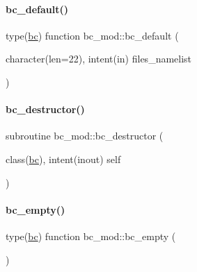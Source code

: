 \paragraph{\texorpdfstring{bc\+\_\+default()}{bc\_default()}}
{\footnotesize\ttfamily type(\mbox{\hyperlink{structbc__mod_1_1bc}{bc}}) function bc\+\_\+mod\+::bc\+\_\+default (\begin{DoxyParamCaption}\item[{character(len=22), intent(in)}]{files\+\_\+namelist }\end{DoxyParamCaption})\hspace{0.3cm}{\ttfamily [private]}}

\mbox{\label{namespacebc__mod_a27478494ca4ab470a05ec781192c89e4}} 
\paragraph{\texorpdfstring{bc\+\_\+destructor()}{bc\_destructor()}}
{\footnotesize\ttfamily subroutine bc\+\_\+mod\+::bc\+\_\+destructor (\begin{DoxyParamCaption}\item[{class(\mbox{\hyperlink{structbc__mod_1_1bc}{bc}}), intent(inout)}]{self }\end{DoxyParamCaption})}

\mbox{\label{namespacebc__mod_ae334c602c9a98a75ca25a7af333bb845}} 
\paragraph{\texorpdfstring{bc\+\_\+empty()}{bc\_empty()}}
{\footnotesize\ttfamily type(\mbox{\hyperlink{structbc__mod_1_1bc}{bc}}) function bc\+\_\+mod\+::bc\+\_\+empty (\begin{DoxyParamCaption}{ }\end{DoxyParamCaption})\hspace{0.3cm}{\ttfamily [private]}}

\mbox{\label{namespacebc__mod_a394924f0b959c0b53a721661a6c81249}} 
